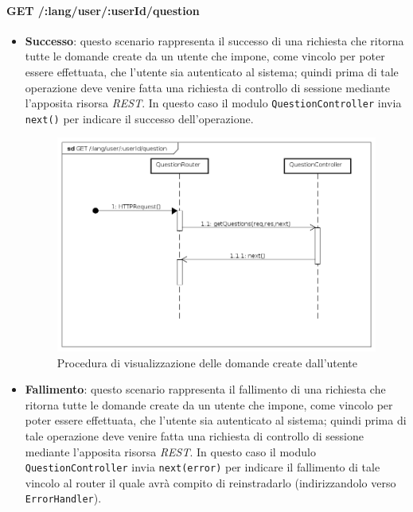 
\paragraph{GET /:lang/user/:userId/question}
\begin{itemize}
\item \textbf{Successo}: questo scenario rappresenta il successo di una richiesta che ritorna tutte le domande create da un utente che impone, come vincolo per poter essere effettuata, che l'utente sia autenticato al sistema; quindi prima di tale operazione deve venire fatta una richiesta di controllo di sessione mediante l'apposita risorsa \textit{REST}. In questo caso il modulo \texttt{QuestionController} invia \texttt{next()} per indicare il successo dell'operazione.

\begin{figure}[ht]
	\centering
	\includegraphics[scale=0.45]{UML/DiagrammiDiSequenza/Back-end/GET__lang_user__userId_question_success.png}
	\caption{Procedura di visualizzazione delle domande create dall'utente}
\end{figure}
\FloatBarrier

\item \textbf{Fallimento}: questo scenario rappresenta il fallimento di una richiesta che ritorna tutte le domande create da un utente che impone, come vincolo per poter essere effettuata, che l'utente sia autenticato al sistema; quindi prima di tale operazione deve venire fatta una richiesta di controllo di sessione mediante l'apposita risorsa \textit{REST}. In questo caso il modulo \texttt{QuestionController} invia \texttt{next(error)} per indicare il fallimento di tale vincolo al router il quale avrà compito di reinstradarlo (indirizzandolo verso \texttt{ErrorHandler}).


\end{itemize}
